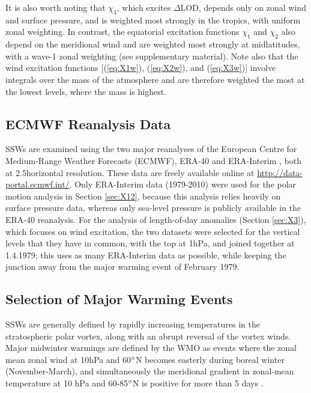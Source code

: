 \documentclass[draft,jgrga]{agutex}
\begin{document}
\begin{article}
It is also worth noting that $\chi_3$, which excites $\Delta \text{LOD}$, depends only on zonal wind and surface pressure, and is weighted most strongly in the tropics, with uniform zonal weighting.  
In contrast, the equatorial excitation functions $\chi_1$ and $\chi_2$ also depend on the meridional wind and are weighted most strongly at midlatitudes,  {with a wave-1 zonal weighting (see supplementary material)}.
Note also that  the wind excitation functions [(\ref{eq:X1w}), (\ref{eq:X2w}), and (\ref{eq:X3w})] involve integrals over the mass of the atmosphere and are therefore  weighted  {the most at the lowest levels}, where the mass is highest.




\subsection{ECMWF Reanalysis Data}
\label{sec:ERA}
SSWs are examined using the two major reanalyses of the European Centre for Medium-Range Weather Forecasts (ECMWF), ERA-40 \citep{uppalaetal2005} and ERA-Interim \citep{deeetal2011}, both at 2.5\degree horizontal resolution.
These data are freely available online at \url{http://data-portal.ecmwf.int/}.
Only ERA-Interim data (1979-2010) were used for the polar motion analysis in Section \ref{sec:X12}, because this analysis relies heavily on surface pressure data, whereas only sea-level pressure is publicly available in the ERA-40 reanalysis.
For the analysis of length-of-day anomalies (Section \ref{sec:X3}), which focuses on wind excitation, the two datasets were selected for the vertical levels that they have in common, with the top at 1hPa, and joined together at 1.4.1979; this uses as many ERA-Interim data as possible, while keeping the junction away from the major warming event of February 1979.


\subsection{Selection of Major Warming Events}
\label{sec:selection}

SSWs are generally defined by rapidly increasing temperatures in the stratospheric polar vortex, along with an abrupt reversal of the vortex winds.
Major midwinter warmings are defined by the WMO  as events where the zonal
mean zonal wind at 10hPa and 60$^\circ$N becomes easterly during 
boreal winter (November-March), and simultaneously the meridional gradient in
zonal-mean temperature at 10 hPa and 60-85$^\circ$N is positive for more than 5
days \citep{labitzkenaujokat2000}.


\end{article}
\end{document}
